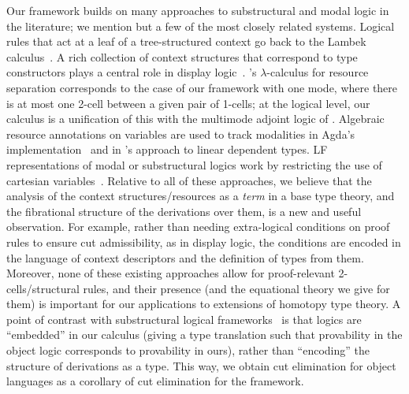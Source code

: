 Our framework builds on many approaches to substructural and modal logic
in the literature; we mention but a few of the most closely related
systems.  Logical rules that act at a leaf of a tree-structured context
go back to the Lambek calculus~\citep{lambek58calculus}.  A rich
collection of context structures that correspond to type constructors
plays a central role in display logic~\citep{belnap82display}.
\citet{atkey04separation}'s $\lambda$-calculus for resource separation
corresponds to the case of our framework with one mode, where there is
at most one 2-cell between a given pair of 1-cells; at the logical
level, our calculus is a unification of this with the multimode adjoint
logic of \citet{reed09adjoint}.  Algebraic resource annotations on
variables are used to track modalities in Agda's
implementation~\citep{abel15modal} and in \citet{mcbride16nuttin}'s
approach to linear dependent types.  LF representations of modal or
substructural logics work by restricting the use of cartesian
variables~\citep{crary10substructural}.  Relative to all of these
approaches, we believe that the analysis of the context
structures/resources as a \emph{term} in a base type theory, and the
fibrational structure of the derivations over them, is a new and useful
observation.  For example, rather than needing extra-logical conditions
on proof rules to ensure cut admissibility, as in display logic, the
conditions are encoded in the language of context descriptors and the
definition of types from them.  Moreover, none of these existing
approaches allow for proof-relevant 2-cells/structural rules, and their
presence (and the equational theory we give for them) is important for
our applications to extensions of homotopy type theory.  A point of
contrast with substructural logical
frameworks~\citep{cervesatopfenning02llf,watkins+03clf-tr,reed09thesis}
is that logics are ``embedded'' in our calculus (giving a type
translation such that provability in the object logic corresponds to
provability in ours), rather than ``encoding'' the structure of
derivations as a type.  This way, we obtain cut elimination for object
languages as a corollary of cut elimination for the framework.
 
